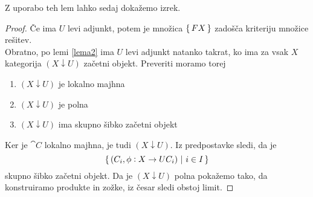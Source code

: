 \documentclass[../kategoricna_logika.tex]{subfiles}
\begin{document}
Z uporabo teh lem lahko sedaj dokažemo izrek.
\begin{proof}
Če ima $U$ levi adjunkt, potem je množica $\{\,FX\,\}$ zadošča kriteriju množice rešitev.\\
Obratno, po lemi \ref{lema2} ima $U$ levi adjunkt natanko takrat, ko ima za vsak $X$ kategorija $(X \downarrow U)$ začetni objekt. Preveriti moramo torej
\begin{enumerate}
\item $(X \downarrow U)$ je lokalno majhna
\item $(X \downarrow U)$ je polna 
\item $(X \downarrow U)$ ima skupno šibko začetni objekt
\end{enumerate}
Ker je $\cat{C}$ lokalno majhna, je tudi $(X \downarrow U)$. Iz predpostavke sledi, da je
$$\{\,(C_i, \phi : X \to UC_i) \ \vert \ i \in I\,\}$$
skupno šibko začetni objekt. Da je $(X \downarrow U)$ polna pokažemo tako, da konstruiramo produkte in zožke, iz česar sledi obstoj limit. 
\end{proof}
\end{document}
